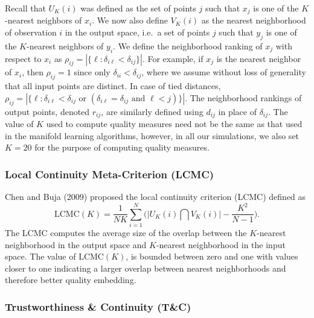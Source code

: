 \documentclass[12pt]{article}
\begin{document}
Recall that \(U_K(i)\) was defined as the set of points \(j\) such that \(x_j\) is one of the \(K\)-nearest neighbors of \(x_i\). We now also define \(V_K(i)\) as the nearest neighborhood of observation \(i\) in the output space, i.e.~a set of points \(j\) such that \(y_j\) is one of the \(K\)-nearest neighbors of \(y_i\). We define the neighborhood ranking of \(x_j\) with respect to \(x_i\) as \(\rho_{ij} =|\{\ell: \delta_{i \ell}<\delta_{i j}\} |\). For example, if \(x_j\) is the nearest neighbor of \(x_i\), then \(\rho_{ij}=1\) since only \(\delta_{ii}<\delta_{ij}\), where we assume without loss of generality that all input points are distinct. In case of tied distances, \(\rho_{ij} =\left|\big\{\ell: \delta_{i \ell}<\delta_{i j} \text { or }(\delta_{i \ell}=\delta_{i j} \text { and } \ell<j)\big\}\right|\). The neighborhood rankings of output points, denoted \(r_{ij}\), are similarly defined using \(d_{ij}\) in place of \(\delta_{ij}\). The value of \(K\) used to compute quality measures need not be the same as that used in the manifold learning algorithms, however, in all our simulations, we also set \(K=20\) for the purpose of computing quality measures.

\hypertarget{local-continuity-meta-criterion-lcmc}{%
\subsubsection*{Local Continuity Meta-Criterion (LCMC)}\label{local-continuity-meta-criterion-lcmc}}

Chen and Buja (2009) proposed the local continuity criterion (LCMC) defined as
\begin{equation}\label{eq:LCMC}
  \text{LCMC}(K)=\frac{1}{N K} \sum_{i=1}^{N}\Big(\big| U_K(i) \bigcap V_K(i) \big| - \frac{K^{2}}{N-1}\Big).
\end{equation}
The LCMC computes the average size of the overlap between the \(K\)-nearest neighborhood in the output space and \(K\)-nearest neighborhood in the input space. The value of LCMC\((K)\), is bounded between zero and one with values closer to one indicating a larger overlap between nearest neighborhoods and therefore better quality embedding.

\hypertarget{trustworthiness-continuity-tc}{%
\subsubsection*{Trustworthiness \& Continuity (T\&C)}\label{trustworthiness-continuity-tc}}
\end{document}
